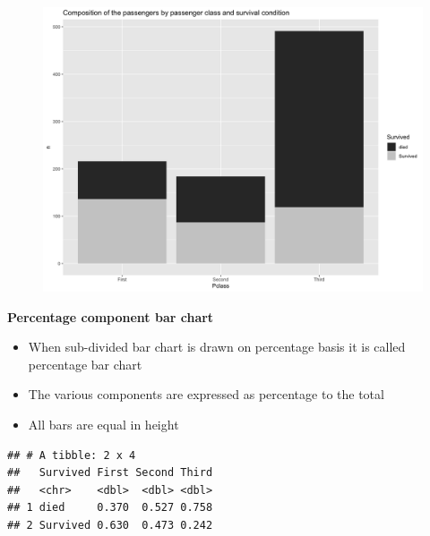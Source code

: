 \documentclass[]{book}
\providecommand{\tightlist}{%
  \setlength{\itemsep}{0pt}\setlength{\parskip}{0pt}}
\begin{document}
\begin{figure}

{\centering \includegraphics[width=1\linewidth]{figure/box10-1} 

}

\end{figure}

\textbf{Percentage component bar chart}

\begin{itemize}
\tightlist
\item
  When sub-divided bar chart is drawn on percentage basis it is called percentage bar chart
\item
  The various components are expressed as percentage to the total
\item
  All bars are equal in height
\end{itemize}

\begin{verbatim}
## # A tibble: 2 x 4
##   Survived First Second Third
##   <chr>    <dbl>  <dbl> <dbl>
## 1 died     0.370  0.527 0.758
## 2 Survived 0.630  0.473 0.242
\end{verbatim}
\end{document}

